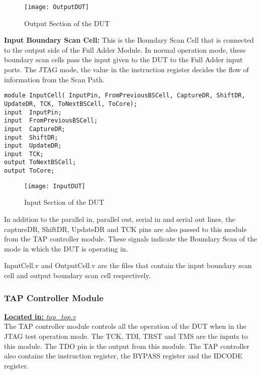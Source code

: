 \documentclass[a4paper,11pt]{article}
\begin{document}
\begin{figure}[ht]
\centering
\texttt{[image: OutputDUT]}
\caption{Output Section of the DUT}
\label{fig: Output DUT}
\end{figure}

\FloatBarrier
\textbf{Input Boundary Scan Cell:}
This is the Boundary Scan Cell that is connected to the output side of the Full Adder Module. In normal operation mode, these boundary scan cells pass the input given to the DUT to the Full Adder input ports. The JTAG mode, the value in the instruction register decides the flow of information from the Scan Path.

\begin{lstlisting}[style={verilog-style}, backgroundcolor=\color{lightgray}]
module InputCell( InputPin, FromPreviousBSCell, CaptureDR, ShiftDR, 
UpdateDR, TCK, ToNextBSCell, ToCore);
input  InputPin;
input  FromPreviousBSCell;
input  CaptureDR;
input  ShiftDR; 
input  UpdateDR;
input  TCK;
output ToNextBSCell;
output ToCore; 
\end{lstlisting}

\begin{figure}[ht]
\centering
\texttt{[image: InputDUT]}
\caption{Input Section of the DUT}
\label{fig: Input DUT}
\end{figure}

In addition to the parallel in, parallel out, serial in and serial out lines, the captureDR, ShiftDR, UpdateDR and TCK pins are also passed to this module from the TAP controller module. These signals indicate the Boundary Scan of the mode in which the DUT is operating in.

InputCell.v and OutputCell.v are the files that contain the input boundary scan cell and output boundary scan cell respectively.


\FloatBarrier
\subsubsection{TAP Controller Module}
\underline{\textbf{Located in:} \textit{tap\_top.v}}\\

The TAP controller module controls all the operation of the DUT when in the JTAG test operation mode. The TCK, TDI, TRST and TMS are the inputs to this module. The TDO pin is the output from this module. The TAP controller also contains the instruction register, the BYPASS register and the IDCODE register.
\end{document}
